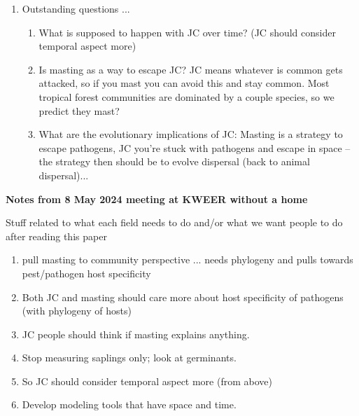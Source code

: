 \documentclass[11pt]{article}
\begin{document}
\begin{enumerate}
\begin{enumerate}
\item Latitudinal gradients? 
\begin{enumerate}
\item JC helps explain latitudinal gradient, but evidence is pretty weak; if masting is more prevalent in northern latitudes, then you might resolve this lack of evidence by ...
\item if masting species are more prevalent outside the tropics then they escape CNDD and this explains latitudinal gradient in diversity (but -- you may think, `hey there's no evidence of less CNDD in temperate' and we say -- people have not looked at space and time properly)
\end{enumerate}
\end{enumerate}
\item Outstanding questions ...
\begin{enumerate}
\item What is supposed to happen with JC over time? (JC should consider temporal aspect more)
\item Is masting as a way to escape JC? JC means whatever is common gets attacked, so if you mast you can avoid this and stay common. Most tropical forest communities are dominated by a couple species, so we predict they mast? 
\item What are the evolutionary implications of JC: Masting is a strategy to escape pathogens, JC you're stuck with pathogens and escape in space -- the strategy then should be to evolve dispersal (back to animal dispersal)... 
\end{enumerate}
\end{enumerate}

\vspace{5ex}
{\bf Notes from 8 May 2024 meeting at KWEER without a home}

Stuff related to what each field needs to do and/or what we want people to do after reading this paper
\begin{enumerate}
\item pull masting to community perspective ... needs phylogeny and pulls towards pest/pathogen host specificity 
\item  Both JC and masting should care more about host specificity of pathogens (with phylogeny of hosts)
\item JC people should think if masting explains anything. 
\item Stop measuring saplings only; look at germinants. 
\item So JC should consider temporal aspect more (from above) 
\item Develop modeling tools that have space and time.
\end{enumerate}
\end{document}

